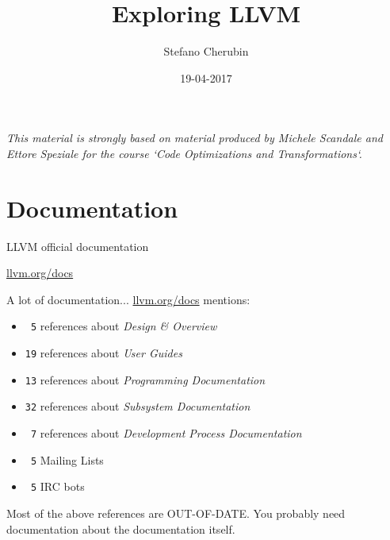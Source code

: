 \documentclass[10pt,mathserif]{beamer}
\author{Stefano Cherubin}
\institute{Politecnico di Milano}
\date{19-04-2017}
\title{Exploring LLVM}
\begin{document}
\begin{frame}
\maketitle
\begin{center}
\itshape\scriptsize This material is strongly based on material produced by
                    Michele Scandale and Ettore Speziale for the course
                    `Code Optimizations and Transformations`.
\end{center}
\end{frame}

\section{Documentation}
\begin{frame}[t]{LLVM official documentation}
  \begin{center}
    \begin{Huge}
      \vfill
      \url{llvm.org/docs}
      \vfill
    \end{Huge}
  \end{center}
\end{frame}

\begin{frame}[t]{A lot of documentation...}
  \url{llvm.org/docs} mentions:
  \begin{itemize}
    \item \texttt{\ 5} references about \textit{Design \& Overview}
    \item \texttt{19} references about \textit{User Guides}
    \item \texttt{13} references about \textit{Programming Documentation}
    \item \texttt{32} references about \textit{Subsystem Documentation}
    \item \texttt{\ 7} references about \textit{Development Process Documentation}
    \item \texttt{\ 5} Mailing Lists
    \item \texttt{\ 5} IRC bots
  \end{itemize}
  \vfill
  Most of the above references are OUT-OF-DATE.
  \vfill
  You probably need documentation about the documentation itself.
  \vfill
\end{frame}
\end{document}
